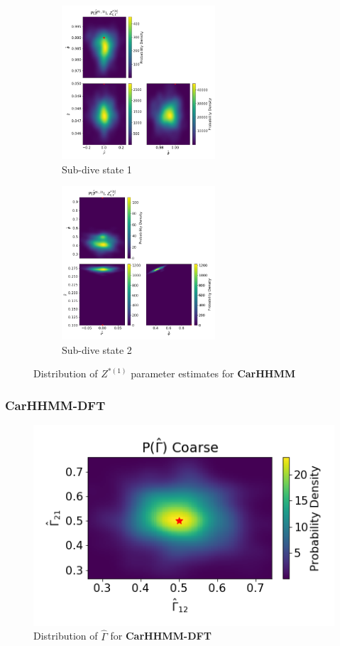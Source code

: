 \documentclass[12pt]{TD-CJS}
\begin{document}
\begin{figure}[ht]
	\centering
	\begin{subfigure}[t]{0.45\textwidth}
        \centering
        \includegraphics[width=2.25in]{../Plots/hhmm_V_MLE_density_A_0_0.png}
        \caption{Sub-dive state 1}
    \end{subfigure}
    \begin{subfigure}[t]{0.45\textwidth}
        \centering
        \includegraphics[width=2.25in]{../Plots/hhmm_V_MLE_density_A_0_1.png}
        \caption{Sub-dive state 2}
    \end{subfigure}
    \caption{Distribution of $Z^{*(1)}$ parameter estimates for \textbf{CarHHMM}}
\end{figure}

\subsubsection{CarHHMM-DFT}

\begin{figure}
    \centering
    \includegraphics[width=5in]{../Plots/hhmm_FV_Gamma_density_-1.png}
    \caption{Distribution of $\hat \Gamma$ for \textbf{CarHHMM-DFT}}
\end{figure}
\end{document}
